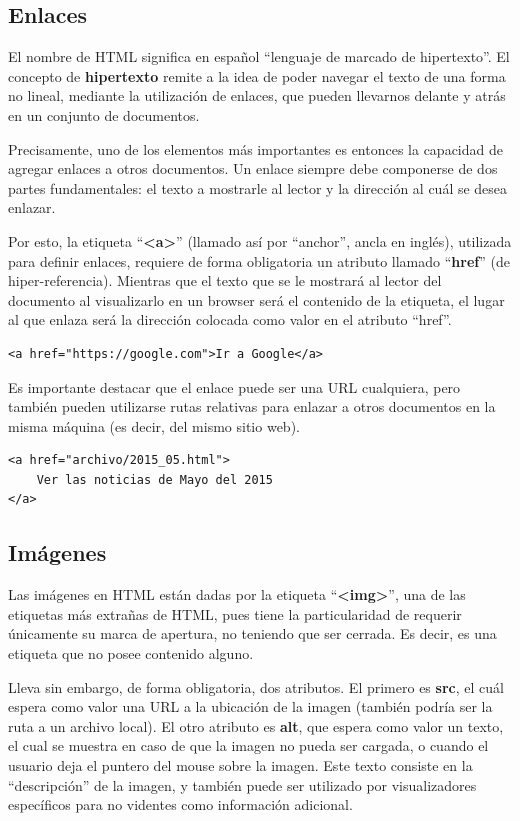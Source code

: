 \subsection*{Enlaces}

El nombre de HTML significa en español ``lenguaje de marcado de hipertexto''. El
concepto de \textbf{hipertexto} remite a la idea de poder navegar el texto de
una forma no lineal, mediante la utilización de enlaces, que pueden llevarnos
delante y atrás en un conjunto de documentos.

Precisamente, uno de los elementos más importantes es entonces la capacidad de
agregar enlaces a otros documentos. Un enlace siempre debe componerse de dos partes
fundamentales: el texto a mostrarle al lector y la dirección al cuál se desea enlazar.

Por esto, la etiqueta ``\textbf{<a>}'' (llamado así por ``anchor'', ancla en
inglés), utilizada para definir enlaces, requiere de forma obligatoria un
atributo llamado ``\textbf{href}'' (de hiper-referencia). Mientras que el texto
que se le mostrará al lector del documento al visualizarlo en un browser será
el contenido de la etiqueta, el lugar al que enlaza será la dirección
colocada como valor en el atributo ``href''.

\begin{lstlisting}[language=XHTML]
<a href="https://google.com">Ir a Google</a>
\end{lstlisting}

Es importante destacar que el enlace puede ser una URL cualquiera, pero también
pueden utilizarse rutas relativas para enlazar a otros documentos en la misma
máquina (es decir, del mismo sitio web).

\begin{lstlisting}[language=XHTML]
<a href="archivo/2015_05.html">
    Ver las noticias de Mayo del 2015
</a>
\end{lstlisting}

\subsection*{Imágenes}

Las imágenes en HTML están dadas por la etiqueta ``\textbf{<img>}'',
una de las etiquetas más extrañas de HTML, pues tiene la particularidad de
requerir únicamente su marca de apertura, no teniendo que ser cerrada. Es
decir, es una etiqueta que no posee contenido alguno.

Lleva sin embargo, de forma obligatoria, dos atributos. El primero es
\textbf{src}, el cuál espera como valor una URL a la ubicación de la imagen
(también podría ser la ruta a un archivo local). El otro atributo es \textbf{alt},
que espera como valor un texto, el cual se muestra en caso de que la imagen no
pueda ser cargada, o cuando el usuario deja el puntero del mouse sobre la imagen.
Este texto consiste en la ``descripción'' de la imagen, y también puede ser utilizado
por visualizadores específicos para no videntes como información adicional.

